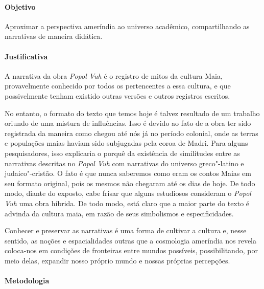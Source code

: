 \documentclass[11pt]{extarticle}
\begin{document}
\paragraph{Objetivo} Aproximar a perspectiva ameríndia ao universo acadêmico, 
compartilhando as narrativas de maneira didática.

\paragraph{Justificativa} A narrativa da obra \emph{Popol Vuh} é o registro de mitos da
cultura Maia, provavelmente conhecido por todos os pertencentes a essa
cultura, e que possivelmente tenham existido outras versões e outros registros
escritos.

No entanto, o formato do texto que temos hoje é talvez
resultado de um trabalho oriundo de uma mistura de influências. Isso é
devido ao fato de a obra ter sido registrada da maneira como chegou até
nós já no período colonial, onde as terras e populações maias haviam
sido subjugadas pela coroa de Madri. Para alguns pesquisadores, isso
explicaria o porquê da existência de similitudes entre as narrativas
descritas no \emph{Popol Vuh} com narrativas do universo greco"-latino e
judaico"-cristão. O fato é que nunca saberemos como eram os contos Maias
em seu formato original, pois os mesmos não chegaram até os dias de
hoje. De todo modo, diante do exposto, cabe frisar que alguns estudiosos
consideram o \emph{Popol Vuh} uma obra híbrida. De todo modo, está
claro que a maior parte do texto é advinda da cultura maia, em razão de
seus simbolismos e especificidades.

Conhecer e preservar as narrativas é uma forma de
cultivar a cultura e, nesse sentido, as noções e espacialidades outras 
que a cosmologia ameríndia nos revela coloca-nos em condições de fronteiras 
entre mundos possíveis, possibilitando, por meio delas, expandir nosso 
próprio mundo e nossas próprias percepções.

\paragraph{Metodologia} 
\end{document}
